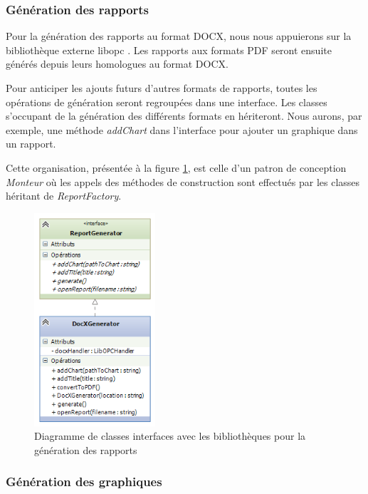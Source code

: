 \documentclass[a4paper,titlepage,french]{report}
\begin{document}
\subsubsection{Génération des rapports}

Pour la génération des rapports au format DOCX, nous nous appuierons sur la bibliothèque externe libopc \cite{website:libopc}.
Les rapports aux formats PDF seront ensuite générés depuis leurs homologues au format DOCX.

Pour anticiper les ajouts futurs d'autres formats de rapports, toutes les opérations de génération seront regroupées dans une interface.
Les classes s'occupant de la génération des différents formats en hériteront.
Nous aurons, par exemple, une méthode \textit{addChart} dans l'interface pour ajouter un graphique dans un rapport.

Cette organisation, présentée à la figure \ref{fig:diagramme-classes-interface-report}, est celle d'un patron de conception \textit{Monteur} où les appels des méthodes de construction sont effectués par les classes héritant de \textit{ReportFactory}.

\begin{figure}
  	\center
  	\includegraphics[width=0.4\textwidth]{diagramme-classes-interface-report.png}
  	\caption{Diagramme de classes interfaces avec les bibliothèques pour la génération des rapports}
  	\label{fig:diagramme-classes-interface-report}
\end{figure}


\subsubsection{Génération des graphiques}
\end{document}
